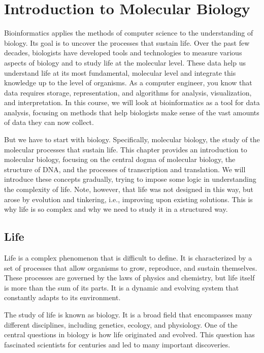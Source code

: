 \chapter{Introduction to Molecular Biology}
\label{ch:intro-mol-biol}

Bioinformatics applies the methods of computer science to the understanding of biology. Its goal is to uncover the processes that sustain life. Over the past few decades, biologists have developed tools and technologies to measure various aspects of biology and to study life at the molecular level. These data help us understand life at its most fundamental, molecular level and integrate this knowledge up to the level of organisms. As a computer engineer, you know that data requires storage, representation, and algorithms for analysis, visualization, and interpretation. In this course, we will look at bioinformatics as a tool for data analysis, focusing on methods that help biologists make sense of the vast amounts of data they can now collect.

But we have to start with biology. Specifically, molecular biology, the study of the molecular processes that sustain life. This chapter provides an introduction to molecular biology, focusing on the central dogma of molecular biology, the structure of DNA, and the processes of transcription and translation. We will introduce these concepts gradually, trying to impose some logic in understanding the complexity of life. Note, however, that life was not designed in this way, but arose by evolution and tinkering, i.e., improving upon existing solutions. This is why life is so complex and why we need to study it in a structured way.

\section{Life}

Life is a complex phenomenon that is difficult to define. It is characterized by a set of processes that allow organisms to grow, reproduce, and sustain themselves. These processes are governed by the laws of physics and chemistry, but life itself is more than the sum of its parts. It is a dynamic and evolving system that constantly adapts to its environment.

The study of life is known as biology. It is a broad field that encompasses many different disciplines, including genetics, ecology, and physiology. One of the central questions in biology is how life originated and evolved. This question has fascinated scientists for centuries and led to many important discoveries.

